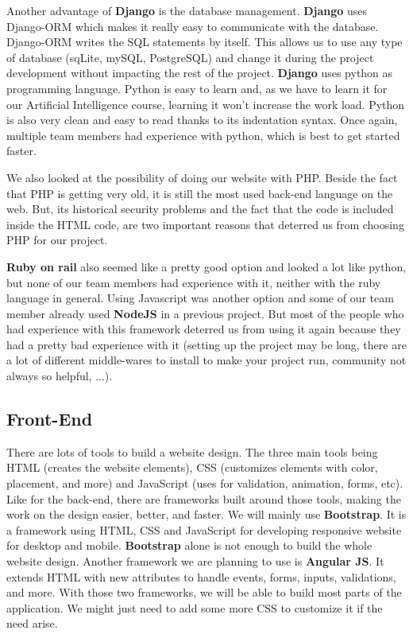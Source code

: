 Another advantage of \textbf{Django} is the database management. \textbf{Django} uses Django-ORM which makes it really easy to communicate with the database. Django-ORM writes the SQL statements by itself. This allows us to use any type of database (sqLite, mySQL, PostgreSQL) and change it during the project development without impacting the rest of the project.
\textbf{Django} uses python as programming language. Python is easy to learn and, as we have to learn it for our Artificial Intelligence course, learning it won't increase the work load.
Python is also very clean and easy to read thanks to its indentation syntax. Once again, multiple team members had experience with python, which is best to get started faster.\newline

We also looked at the possibility of doing our website with PHP. Beside the fact that PHP is getting very old, it is still the most used back-end language on the web. But, its historical security problems and the fact that the code is included inside the HTML code, are two important  reasons that deterred us from choosing PHP for our project.\newline

\textbf{Ruby on rail} also seemed like a pretty good option and looked a lot like python, but none of our team members had experience with it, neither with the ruby language in general. Using Javascript was another option and some of our team member already used \textbf{NodeJS} in a previous project. But most of the people who had experience with this framework deterred us from using it again because they had a pretty bad experience with it (setting up the project may be long, there are a lot of different middle-wares to install to make your project run, community not always so helpful, ...).

\subsection{Front-End}

There are lots of tools to build a website design. The three main tools being HTML (creates the website elements), CSS (customizes elements with color, placement, and more) and JavaScript (uses for validation, animation, forms, etc). Like for the back-end, there are frameworks built around those tools, making the work on the design easier, better, and faster. We will mainly use \textbf{Bootstrap}. It is a framework using HTML, CSS and JavaScript for developing responsive website for desktop and mobile. \textbf{Bootstrap} alone is not enough to build the whole website design. Another framework we are planning to use is \textbf{Angular JS}. It extends HTML with new attributes to handle events, forms, inputs, validations, and more. With those two frameworks, we will be able to build most parts of the application. We might just need to add some more CSS to customize it if the need arise.


